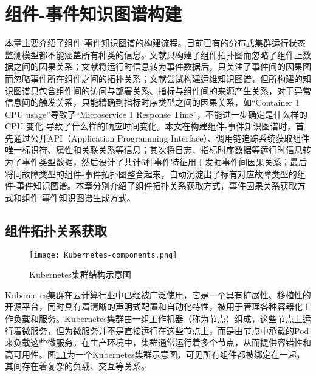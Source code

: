 \chapter{组件-事件知识图谱构建}
本章主要介绍了组件-事件知识图谱的构建流程。目前已有的分布式集群运行状态监测模型都不能涵盖所有种类的信息。文献\parencite{wang2019grano}只构建了组件拓扑图而忽略了组件上数据之间的因果关系；文献\parencite{nie2016mining-causality-graph}将运行时信息转为事件数据后，只关注了事件间的因果图而忽略事件所在组件之间的拓扑关系；文献\parencite{qiu2020causality-mining-knowledge-graph}尝试构建运维知识图谱，但所构建的知识图谱只包含组件间的访问与部署关系、指标与组件间的来源产生关系，对于异常信息间的触发关系，只能精确到指标时序类型之间的因果关系，如“Container
1 CPU usage”导致了“Microservice 1 Response Time”，不能进一步确定是什么样的 CPU 变化
导致了什么样的响应时间变化。本文在构建组件-事件知识图谱时，首先通过公开API（Application Programming Interface）、调用链追踪系统获取组件唯一标识符、属性和关联关系等信息；其次将日志、指标时序数据等运行时信息转为了事件类型数据，然后设计了共计6种事件特征用于发掘事件间因果关系；最后将同故障类型的组件-事件拓扑图整合起来，自动沉淀出了标有对应故障类型的组件-事件知识图谱。本章分别介绍了组件拓扑关系获取方式，事件因果关系获取方式和组件-事件知识图谱生成方式。

\section{组件拓扑关系获取}
\begin{figure}[htbp]
    \centering
    \texttt{[image: Kubernetes-components.png]}
    \caption{Kubernetes集群结构示意图\label{Kubernetes-components}}
\end{figure}
Kubernetes集群\cite{bernstein2014containers}在云计算行业中已经被广泛使用，它是一个具有扩展性、移植性的开源平台，同时具有着清晰的声明式配置和自动化特性，被用于管理各种容器化工作负载和服务。Kubernetes集群由一组工作机器（称为节点）组成，这些节点上运行着微服务，但为微服务并不是直接运行在这些节点上，而是由节点中承载的Pod来负载这些微服务。在生产环境中，集群通常运行着多个节点，从而提供容错性和高可用性。图\ref{Kubernetes-components}为一个Kubernetes集群示意图，可见所有组件都被绑定在一起，其间存在着复杂的负载、交互等关系。

